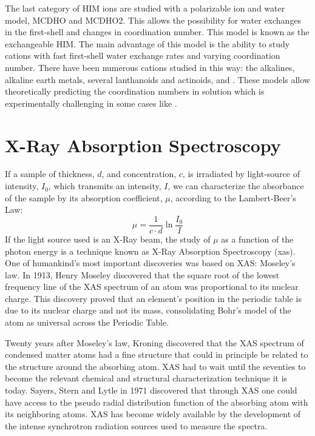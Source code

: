 The last category of HIM ions are studied with a polarizable ion and water model, 
MCDHO and MCDHO2\cite{MCDHO,MCDHO2}. This allows the possibility for water exchanges in the 
first-shell and changes in coordination number. This model is known as the exchangeable HIM. The 
main advantage of this model is the ability to study cations with fast first-shell water exchange 
rates 
and varying coordination number. There have been numerous cations studied in this way: the 
alkalines, alkaline earth metals, several lanthanoids and actinoids,  and 
\cite{caralimpio2018looking,thesisNoe,Angew_ESM_2010,Caralampio2017b,Caralampio2017,
Morales2016,Yang2001}. These models allow theoretically predicting the coordination numbers in 
solution 
which is experimentally challenging in some cases like 
.\cite{Caralampio2017b,cotton2018scandium}





\section{X-Ray Absorption Spectroscopy}\label{sec:XAS}
If a sample of thickness, $d$, and concentration, $c$, is irradiated by light-source of 
intensity, 
$I_0$, which transmits an intensity, $I$, we can characterize the absorbance of the sample by its 
absorption coefficient, $\mu$, according to the Lambert-Beer's Law:
\begin{equation}
 \mu=\frac{1}{c\cdot d}\ln{\frac{I_0}{I}}
\end{equation}
If the light source used is an X-Ray beam, the study of $\mu$ as a function of the photon 
energy is a technique known as X-Ray Absorption Spectroscopy (\gls{xas}). One of humankind's most 
important discoveries was based on XAS: Moseley's law. In 1913, Henry Moseley discovered that the 
square root of the lowest frequency line of the XAS spectrum of an atom was 
proportional to its nuclear charge. This discovery proved that an element's position in the 
periodic table is due to its nuclear charge and not its mass, consolidating Bohr's model of the 
atom as universal across the Periodic Table. 

Twenty years after Moseley's law, Kroning discovered that the XAS spectrum of condensed 
matter atoms had a fine structure that could in principle be related to the structure around 
the absorbing atom. XAS had to wait until the seventies to become the relevant 
chemical and structural characterization technique it is today. Sayers, Stern and Lytle in 
1971 discovered that through XAS one could have access to the pseudo radial 
distribution function of the absorbing atom with its neighboring atoms.\cite{sayers1971new} XAS has 
become widely 
available by the development of the 
intense synchrotron radiation sources used to measure the spectra. 

